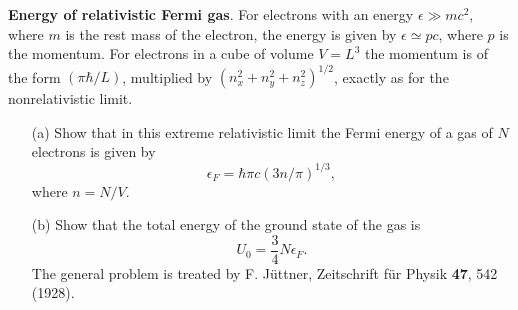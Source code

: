 \documentclass[twoside]{amsart}
\theoremstyle{plain}
\theoremstyle{definition}
\newcommand{\problemhead}[1]
  {
   \noindent{\small\bf Problem #1.}
   }
\begin{document}
\problemhead{2} \textbf{Energy of relativistic Fermi gas}.  For electrons with an energy $\epsilon \gg mc^2$, where $m$ is the rest mass of the electron, the energy is given by $\epsilon \simeq pc$, where $p$ is the momentum.  For electrons in a cube of volume $V = L^3$ the momentum is of the form $(\pi \hbar /L)$, multiplied by $(n_x^2 + n_y^2 + n_z^2)^{1/2}$, exactly as for the nonrelativistic limit.  \begin{itemize} \item[(a)] Show that in this extreme relativistic limit the Fermi energy of a gas of $N$ electrons is given by
\begin{equation}
  \epsilon_F = \hbar \pi c (3 n/\pi)^{1/3},
\end{equation}
where $n=N/V$.  \item[(b)] Show that the total energy of the ground state of the gas is 
\begin{equation}
  U_0 = \frac{3}{4} N \epsilon_F.
\end{equation}
The general problem is treated by F. J\"{u}ttner, Zeitschrift f\"{u}r Physik \textbf{47}, 542 (1928).  
\end{itemize}
\end{document}
